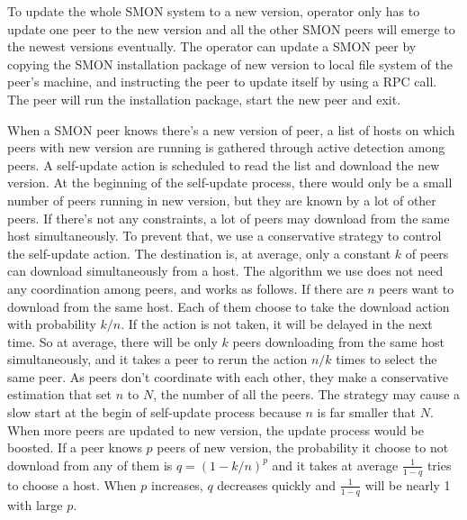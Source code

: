 To update the whole SMON system to a new version, operator
only has to update one peer to the new version and all the
other SMON peers will emerge to the newest versions
eventually. The operator can update a SMON peer by copying
the SMON installation package of new version to local file
system of the peer's machine, and instructing the peer to
update itself by using a RPC call. The peer will run the
installation package, start the new peer and exit.

When a SMON peer knows there's a new version of peer, a list of
hosts on which peers with new version are running is gathered
through active detection among peers.  A self-update action is
scheduled to read the list and download the new version. At the
beginning of the self-update process, there would only be a
small number of peers running in new version, but they are known
by a lot of other peers.  If there's not any constraints, a lot
of peers may download from the same host simultaneously. To
prevent that, we use a conservative strategy to control the
self-update action.  The destination is, at average, only a
constant $k$ of peers can download simultaneously from a host.
The algorithm we use does not need any coordination among peers,
and works as follows.  If there are $n$ peers want to download
from the same host. Each of them choose to take the download
action  with probability $k/n$. If the action is not taken, it
will be delayed in the next time. So at average, there will be
only $k$ peers downloading from the same host simultaneously,
and it takes a peer to rerun the action $n/k$ times to select
the same peer.  As peers don't coordinate with each other, they
make a conservative estimation that set $n$ to $N$, the number
of all the peers. The strategy may cause a slow start at the
begin of self-update process because $n$ is far smaller that
$N$. When more peers are updated to new version, the update
process would be boosted. If a peer knows $p$ peers of new
version, the probability it choose to not download from any of
them is $q=(1-k/n)^p$ and it takes at average $\frac{1}{1-q}$
tries to choose a host. When $p$ increases, $q$ decreases
quickly and $\frac{1}{1-q}$ will be nearly 1 with large $p$.


